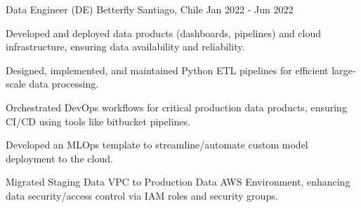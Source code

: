 \cventry
{Data Engineer (DE)}
{Betterfly}
{Santiago, Chile}
{Jan 2022 - Jun 2022}
{
  \begin{cvitems}
    \item Developed and deployed data products (dashboards, pipelines) and cloud infrastructure, ensuring data availability and reliability.
    \item Designed, implemented, and maintained Python ETL pipelines for efficient large-scale data processing.
    \item Orchestrated DevOps workflows for critical production data products, ensuring CI/CD using tools like bitbucket pipelines.
    \item Developed an MLOps template to streamline/automate custom model deployment to the cloud.
    \item Migrated Staging Data VPC to Production Data AWS Environment, enhancing data security/access control via IAM roles and security groups.
  \end{cvitems}
}
